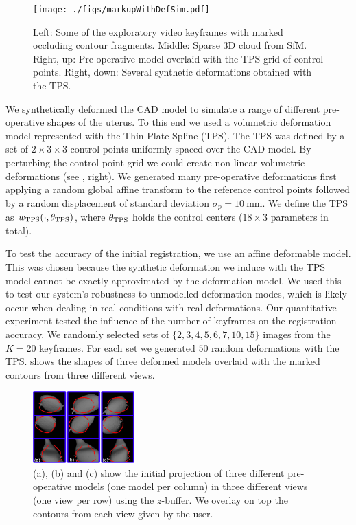 \begin{figure}[htb]
  \centering
  \texttt{[image: ./figs/markupWithDefSim.pdf]}
\caption{Left: Some of the  exploratory video keyframes with marked occluding contour fragments. Middle: Sparse 3D cloud from SfM. Right, up: Pre-operative model overlaid with the TPS grid of control points. Right, down: Several synthetic deformations obtained with the TPS.}
\label{fig:reconstruction}
\end{figure}

We synthetically deformed the CAD model to simulate a range of different pre-operative shapes of the uterus. To this end we used a volumetric deformation model represented with the Thin Plate Spline (TPS). The TPS was defined by a set of $2\times 3 \times 3$ control points uniformly spaced over the CAD model. By perturbing the control point grid we could create non-linear volumetric deformations (see , right). We generated many pre-operative deformations first applying a random global affine transform to the reference control points followed by a random displacement of standard deviation $\sigma_p=\SI{10}{\milli\metre}$. We define the TPS as $w_{\text{TPS}}(\cdot,\theta_{\text{TPS}})$, where $\theta_{\text{TPS}}$ holds the control centers (\ie $18\times 3$ parameters in total).

%
To test the accuracy of the initial registration, we use an affine deformable model. This was chosen because the synthetic deformation we induce with the TPS model cannot be exactly approximated by the deformation model. We used this to test our system's robustness to unmodelled deformation modes, which is likely occur when dealing in real conditions with real deformations.
Our quantitative experiment tested the influence of the number of keyframes on the registration accuracy. We randomly selected sets of $\{2,3,4,5,6,7,10,15\}$ images from the $K=20$ keyframes. For each set we generated $50$ random deformations with the TPS.  shows the shapes of three deformed models overlaid with the marked contours from three different views.
    
\begin{figure}[htb]
  \centering
  \includegraphics[width=0.35\textwidth]{./figs/initial_.pdf}
\caption{(a), (b) and (c) show the initial projection of three different pre-operative models (one model per column) in three different views (one view per row) using the $z$-buffer. We overlay on top the contours from each view given by the user.}
\label{fig:InitialSolutions}
\end{figure}

